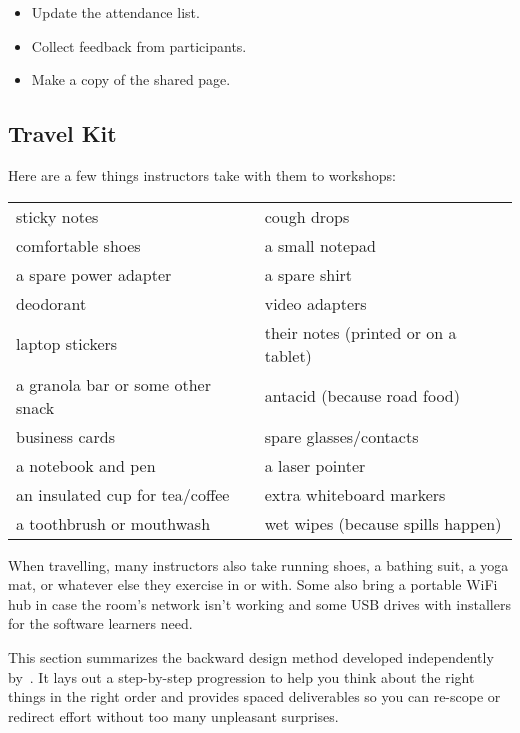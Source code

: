 \begin{itemize}

\item
  Update the attendance list.

\item
  Collect feedback from participants.

\item
  Make a copy of the shared page.

\end{itemize}

\subsection*{Travel Kit}

Here are a few things instructors take with them to workshops:

\begin{longtable}{p{}p{}}

sticky notes & cough drops \\
comfortable shoes & a small notepad \\
a spare power adapter & a spare shirt \\
deodorant & video adapters \\
laptop stickers & their notes (printed or on a tablet) \\
a granola bar or some other snack & antacid (because road food) \\
business cards & spare glasses/contacts \\
a notebook and pen & a laser pointer \\
an insulated cup for tea/coffee & extra whiteboard markers \\
a toothbrush or mouthwash & wet wipes (because spills happen) \\

\end{longtable}

When travelling,
many instructors also take running shoes, a bathing suit, a yoga mat,
or whatever else they exercise in or with.
Some also bring a portable WiFi hub in case the room's network isn't working
and some USB drives with installers for the software learners need.


This section summarizes the backward design method
developed independently by~\cite{Wigg2005,Bigg2011,Fink2013}.
It lays out a step-by-step progression
to help you think about the right things in the right order
and provides spaced deliverables
so you can re-scope or redirect effort without too many unpleasant surprises.


